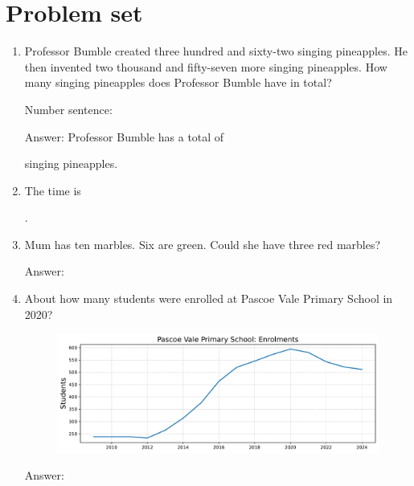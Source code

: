 \documentclass{tufte-book}
\begin{document}
\begin{enumerate}
\end{enumerate}

\clearpage\section{Problem set }

\begin{enumerate}

\item Professor Bumble created three hundred and sixty-two singing pineapples.
He then invented two thousand and fifty-seven more singing pineapples.
How many singing pineapples does Professor Bumble have in total?\bigskip\par
Number sentence: \dotfill\bigskip\par
Answer: Professor Bumble has a total of 
\dotfill\medskip\par\mbox{}\dotfill\medskip\par\mbox{}\dotfill\bigskip
  singing pineapples.

\item {}
The time is \dotfill\bigskip\par\dotfill\bigskip.

\item Mum has ten marbles. Six are green. Could she have three red marbles?\bigskip\par
Answer: \dotfill\bigskip

\item About how many students were enrolled at Pascoe Vale Primary School in 2020?\bigskip\par
\begin{figure}[h]\includegraphics[width=1.3\textwidth]{fig/pvps_enrolments.pdf}\end{figure}
Answer: \dotfill\bigskip\par\dotfill\bigskip
\end{enumerate}
\end{document}
